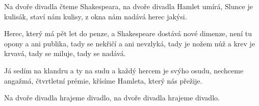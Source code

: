 
\sloka
Na dvoře divadla čteme Shakespeara,
na dvoře divadla Hamlet umírá,
Slunce je kulisák, staví nám kulisy,
z okna nám nadává herec jakýsi.

\sloka
Herec, který má pět let do penze,
a Shakespeare dostává nové dimenze,
není tu opony a ani publika,
tady se nekřičí a ani nevzlyká,
tady je nožem nůž a krev je krvavá,
tady se miluje, tady se nadává.

\sloka
Já sedím na klandru a ty na sudu
a každý hercem je svýho osudu,
nechceme angažmá, čtvrtletní prémie,
křísíme Hamleta, který nás přežije.

\sloka
Na dvoře divadla hrajeme divadlo,
na dvoře divadla hrajeme divadlo.
